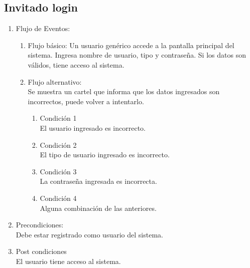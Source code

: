 \documentclass[a4paper,11pt]{article}
\begin{document}
\subsection{Invitado login}
\begin{enumerate}


	\begin{enumerate}
		\item Descripción breve: \\
			Acceso al sistema como usuario.
		\item Actores \\
			Usuario del sistema.
	
		\item Disparadores: \\
			Acceso a la pantalla principal del sistema.

	\end{enumerate}

	\item Flujo de Eventos: 

	\begin{enumerate}
		\item Flujo básico:
			Un usuario gen\'erico accede a la pantalla principal del sistema.
			Ingresa nombre de usuario, tipo y contrase\~na. Si los datos son
			v\'alidos, tiene acceso al sistema.

		\item Flujo alternativo:\\
			Se muestra un cartel que informa que los datos ingresados son
			incorrectos, puede volver a intentarlo.

			\begin{enumerate}
			\item Condición 1 \\
				El usuario ingresado es incorrecto.
			\item Condición 2 \\
				El tipo de usuario ingresado es incorrecto.
			\item Condición 3 \\
				La contrase\~na ingresada es incorrecta.
			\item Condición 4 \\
				Alguna combinaci\'on de las anteriores.
			\end{enumerate}

	\end{enumerate}

	\item Precondiciones: \\
		Debe estar registrado como usuario del sistema.

	\item Post condiciones \\
		El usuario tiene acceso al sistema.

\end{enumerate}
\end{document}
